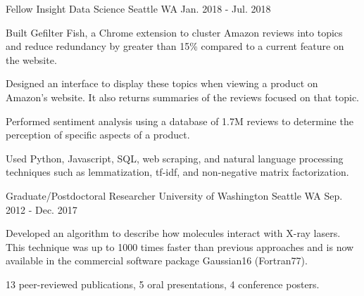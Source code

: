 \begin{cventries}

\cventry
{Fellow} %
{Insight Data Science} %
{Seattle WA} %
{Jan. 2018 - Jul. 2018} %
{ %
\begin{cvitems}
 \vspace{0.1cm}
\item {Built Gefilter Fish, a Chrome extension to cluster Amazon reviews into topics and reduce redundancy by greater than 15\% compared to a current feature on the website.\vspace{0.1cm}}
\item{Designed an interface to display these topics when viewing a product on Amazon's website. It also returns summaries of the reviews focused on that topic.\vspace{0.1cm}}
\item{Performed sentiment analysis using a database of 1.7M reviews to determine the perception of specific aspects of a product.\vspace{0.1cm}}
\item{Used Python, Javascript, SQL, web scraping, and natural language processing techniques such as lemmatization, tf-idf, and non-negative matrix factorization.}
\end{cvitems}
}


\cventry
{Graduate/Postdoctoral Researcher} %
{University of Washington} %
{Seattle WA} %
{Sep. 2012 - Dec. 2017} %
{ 
\begin{cvitems}
 \vspace{0.1cm}
\item{Developed an algorithm to describe how molecules interact with X-ray lasers. This technique was up to 1000 times faster than previous approaches and is now available in the commercial software package Gaussian16 (Fortran77).\vspace{0.1cm}}
\item{13 peer-reviewed publications, 5 oral presentations, 4 conference posters.}
\end{cvitems}
}


\end{cventries}
